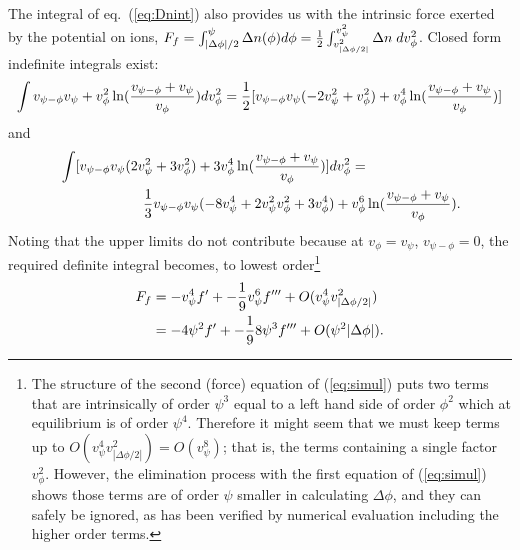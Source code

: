 \documentclass[pre]{revtex4-2}
\begin{document}
The integral of eq.\ (\ref{eq:Dnint}) also provides us with the
intrinsic force exerted by the potential on ions,
$F_f=\int_{|\Delta\phi|/2}^\psi \Delta n(\phi) d\phi = {1\over
  2}\int_{v_{|\Delta\phi/2|}^2}^{v_\psi^2} \Delta n\;
dv_\phi^2$. Closed form indefinite integrals exist:
\begin{equation}
  \label{eq:int1}
  \int v_{\psi-\phi}v_\psi + v_\phi^2\ln({v_{\psi-\phi}+v_\psi\over v_\phi})dv_\phi^2
  ={1\over 2}[ v_{\psi-\phi}v_\psi(-2v_\psi^2+v_\phi^2)+v_\phi^4\ln({v_{\psi-\phi}+v_\psi\over v_\phi})]
\end{equation}
and
\begin{equation}
  \label{eq:int2}\begin{split}
    &\int [v_{\psi-\phi} v_\psi(2v_\psi^2+3v_\phi^2)+3v_\phi^4
    \ln({v_{\psi-\phi}+v_\psi\over v_\phi})]dv_\phi^2
    =\\
    &\qquad\qquad\qquad{1\over3}
    v_{\psi-\phi}v_\psi(-8v_\psi^4+2v_\psi^2 v_\phi^2+3v_\phi^4)
    +v_\phi^6\ln({v_{\psi-\phi}+v_\psi\over v_\phi}).
  \end{split}
\end{equation}
Noting that the upper limits do not contribute because at
$v_\phi=v_\psi$, $v_{\psi-\phi}=0$, the required definite integral
becomes, to lowest order\footnote{The structure of the second (force)
  equation of (\ref{eq:simul}) puts two terms that are intrinsically
  of order $\psi^3$ equal to a left hand side of order $\phi^2$ which
  at equilibrium is of order $\psi^4$. Therefore it might seem that we
  must keep terms up to $O(v_\psi^4v_{|\Delta\phi/2|}^2)=O(v_\psi^8)$;
  that is, the terms containing a single factor $v_\phi^2$. However,
  the elimination process with the first equation of (\ref{eq:simul})
  shows those terms are of order $\psi$ smaller in calculating
  $\Delta\phi$, and they can safely be ignored, as has been verified by
  numerical evaluation including the higher order terms.}
\begin{equation}
  \label{eq:Fintr}
  \begin{split}
    \iffalse
    F_f&=(-v_\psi^4+ {1\over 2}v_\psi^2 v_{|\Delta\phi/2|}^2)f' +
     {1\over
      9}(-v_\psi^6+{5\over 4}v_\psi^4 v_{|\Delta\phi/2|}^2 )f'''
    +O(v_\psi^2v_{|\Delta\phi/2|}^4)\\
    &=(-4\psi^2+\psi|\Delta\phi|)f'+{1\over9}(-8\psi^3+5\psi^2|\Delta\phi|)f'''
    +O(\psi|\Delta\phi|^2).
    \else
    F_f&=-v_\psi^4f' +
     -{1\over
      9}v_\psi^6f'''
    +O(v_\psi^4v_{|\Delta\phi/2|}^2)\\
    &=-4\psi^2f'+-{1\over9}8\psi^3f'''
    +O(\psi^2|\Delta\phi|).
    \fi
    \end{split}
\end{equation}
\end{document}
